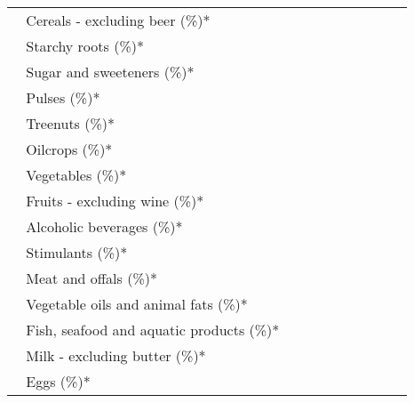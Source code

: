 \begin{tabular}{L{3.9cm} R{1cm} R{1cm} R{1cm}}
	 ~ Cereals - excluding beer (\%)* &  ~ \ \ &  ~ \ \ &  ~ \ \ \\ 
	 ~ Starchy roots (\%)* &  ~ \ \ &  ~ \ \ &  ~ \ \ \\ 
	 ~ Sugar and sweeteners (\%)* &  ~ \ \ &  ~ \ \ &  ~ \ \ \\ 
	 ~ Pulses (\%)* &  ~ \ \ &  ~ \ \ &  ~ \ \ \\ 
	 ~ Treenuts (\%)* &  ~ \ \ &  ~ \ \ &  ~ \ \ \\ 
	 ~ Oilcrops (\%)* &  ~ \ \ &  ~ \ \ &  ~ \ \ \\ 
	 ~ Vegetables (\%)* &  ~ \ \ &  ~ \ \ &  ~ \ \ \\ 
	 ~ Fruits - excluding wine (\%)* &  ~ \ \ &  ~ \ \ &  ~ \ \ \\ 
	 ~ Alcoholic beverages (\%)* &  ~ \ \ &  ~ \ \ &  ~ \ \ \\ 
	 ~ Stimulants (\%)* &  ~ \ \ &  ~ \ \ &  ~ \ \ \\ 
	 ~ Meat and offals (\%)* &  ~ \ \ &  ~ \ \ &  ~ \ \ \\ 
	 ~ Vegetable oils and animal fats (\%)* &  ~ \ \ &  ~ \ \ &  ~ \ \ \\ 
	 ~ Fish, seafood and aquatic products (\%)* &  ~ \ \ &  ~ \ \ &  ~ \ \ \\ 
	 ~ Milk - excluding butter (\%)* &  ~ \ \ &  ~ \ \ &  ~ \ \ \\ 
	 ~ Eggs (\%)* &  ~ \ \ &  ~ \ \ &  ~ \ \ \\ 
       \toprule
      \end{tabular}
      \clearpage
{}
